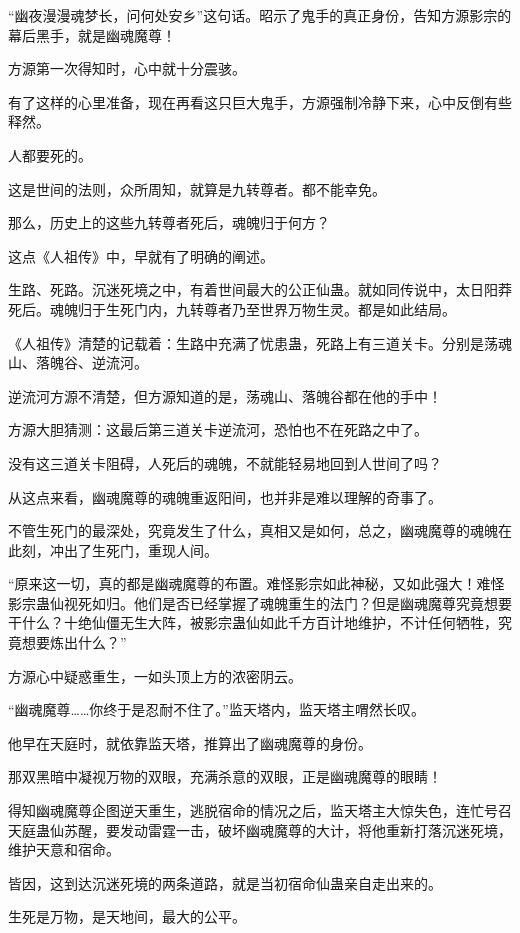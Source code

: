 \begin{this_body}
“幽夜漫漫魂梦长，问何处安乡”这句话。昭示了鬼手的真正身份，告知方源影宗的幕后黑手，就是幽魂魔尊！

方源第一次得知时，心中就十分震骇。

有了这样的心里准备，现在再看这只巨大鬼手，方源强制冷静下来，心中反倒有些释然。

人都要死的。

这是世间的法则，众所周知，就算是九转尊者。都不能幸免。

那么，历史上的这些九转尊者死后，魂魄归于何方？

这点《人祖传》中，早就有了明确的阐述。

生路、死路。沉迷死境之中，有着世间最大的公正仙蛊。就如同传说中，太日阳莽死后。魂魄归于生死门内，九转尊者乃至世界万物生灵。都是如此结局。

《人祖传》清楚的记载着：生路中充满了忧患蛊，死路上有三道关卡。分别是荡魂山、落魄谷、逆流河。

逆流河方源不清楚，但方源知道的是，荡魂山、落魄谷都在他的手中！

方源大胆猜测：这最后第三道关卡逆流河，恐怕也不在死路之中了。

没有这三道关卡阻碍，人死后的魂魄，不就能轻易地回到人世间了吗？

从这点来看，幽魂魔尊的魂魄重返阳间，也并非是难以理解的奇事了。

不管生死门的最深处，究竟发生了什么，真相又是如何，总之，幽魂魔尊的魂魄在此刻，冲出了生死门，重现人间。

“原来这一切，真的都是幽魂魔尊的布置。难怪影宗如此神秘，又如此强大！难怪影宗蛊仙视死如归。他们是否已经掌握了魂魄重生的法门？但是幽魂魔尊究竟想要干什么？十绝仙僵无生大阵，被影宗蛊仙如此千方百计地维护，不计任何牺牲，究竟想要炼出什么？”

方源心中疑惑重生，一如头顶上方的浓密阴云。

“幽魂魔尊……你终于是忍耐不住了。”监天塔内，监天塔主喟然长叹。

他早在天庭时，就依靠监天塔，推算出了幽魂魔尊的身份。

那双黑暗中凝视万物的双眼，充满杀意的双眼，正是幽魂魔尊的眼睛！

得知幽魂魔尊企图逆天重生，逃脱宿命的情况之后，监天塔主大惊失色，连忙号召天庭蛊仙苏醒，要发动雷霆一击，破坏幽魂魔尊的大计，将他重新打落沉迷死境，维护天意和宿命。

皆因，这到达沉迷死境的两条道路，就是当初宿命仙蛊亲自走出来的。

生死是万物，是天地间，最大的公平。


\end{this_body}

